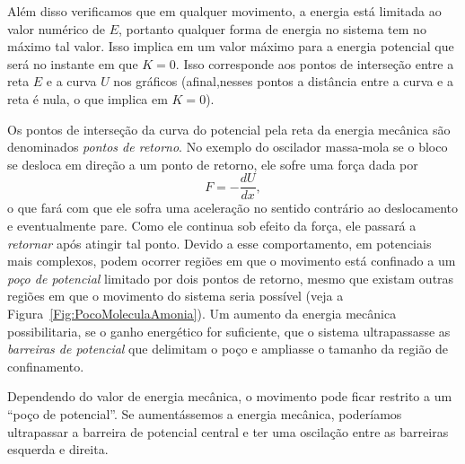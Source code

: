 Além disso verificamos que em qualquer movimento, a energia está limitada ao valor numérico de $E$, portanto qualquer forma de energia no sistema tem no máximo tal valor. Isso implica em um valor máximo para a energia potencial que será no instante em que $K = 0$. Isso corresponde aos pontos de interseção entre a reta $E$ e a curva $U$ nos gráficos (afinal,nesses pontos a distância entre a curva e a reta é nula, o que implica em $K=0$).

Os pontos de interseção da curva do potencial pela reta da energia mecânica são denominados \emph{pontos de retorno}. No exemplo do oscilador massa-mola se o bloco se desloca em direção a um ponto de retorno, ele sofre uma força dada por
\begin{equation*}
  F = -\frac{dU}{dx},
\end{equation*}
%
o que fará com que ele sofra uma aceleração no sentido contrário ao deslocamento e eventualmente pare. Como ele continua sob efeito da força, ele passará a \emph{retornar} após atingir tal ponto. Devido a esse comportamento, em potenciais mais complexos, podem ocorrer regiões em que o movimento está confinado a um \emph{poço de potencial} limitado por dois pontos de retorno, mesmo que existam outras regiões em que o movimento do sistema seria possível (veja a Figura~\ref{Fig:PocoMoleculaAmonia}). Um aumento da energia mecânica possibilitaria, se o ganho energético for suficiente, que o sistema ultrapassasse as \emph{barreiras de potencial} que delimitam o poço e ampliasse o tamanho da região de confinamento.

\begin{marginfigure}
\centering
{}
\caption{Dependendo do valor de energia mecânica, o movimento pode ficar restrito a um ``poço de potencial''. Se aumentássemos a energia mecânica, poderíamos ultrapassar a barreira de potencial central e ter uma oscilação entre as barreiras esquerda e direita. \label{Fig:PocoMoleculaAmonia}}
\end{marginfigure}

